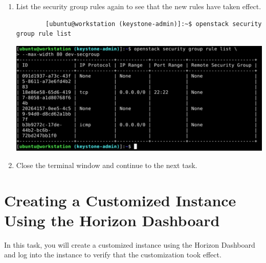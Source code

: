 \documentclass[letterpaper, 12pt]{article}
\begin{document}
\begin{enumerate}
    \item List the security group rules again to see that the new rules have taken effect.
    \begin{lstlisting}
        [ubuntu@workstation (keystone-admin)]:~$ openstack security group rule list
    \end{lstlisting}

    \begin{center}
        \includegraphics[width=\linewidth]{images/part1/step29.png}
    \end{center}

    \item Close the terminal window and continue to the next task.
\end{enumerate}

\section{Creating a Customized Instance Using the Horizon Dashboard}
\label{sec:creating_a_customized_instance_using_the_horizon_dashboard}
In this task, you will create a customized instance using the Horizon Dashboard and log into the instance to verify
that the customization took effect.
\end{document}
